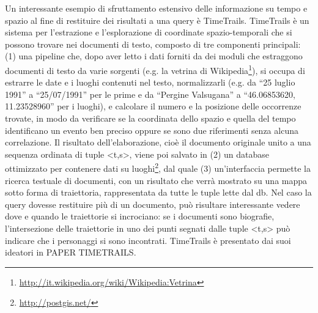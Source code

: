 \documentclass[sigproc-sp.tex]{subfiles}
\begin{document}
Un interessante esempio di sfruttamento estensivo delle informazione su tempo e spazio al fine di restituire dei risultati a una query è TimeTrails. TimeTrails è un sistema per l’estrazione e l’esplorazione di coordinate spazio-temporali che si possono trovare nei documenti di testo, composto di tre componenti principali: (1) una pipeline che, dopo aver letto i dati forniti da dei moduli che estraggono documenti di testo da varie sorgenti (e.g. la vetrina di Wikipedia\footnote{\url{http://it.wikipedia.org/wiki/Wikipedia:Vetrina}}), si occupa di estrarre le date e i luoghi contenuti nel testo, normalizzarli (e.g. da “25 luglio 1991” a “25/07/1991” per le prime e da “Pergine Valsugana” a “46.06853620, 11.23528960” per i luoghi), e calcolare il numero e la posizione delle occorrenze trovate, in modo da verificare se la coordinata dello spazio e quella del tempo identificano un evento ben preciso oppure se sono due riferimenti senza alcuna correlazione. Il risultato dell’elaborazione, cioè il documento originale unito a una sequenza ordinata di tuple <t,s>, viene poi salvato in (2) un database ottimizzato per contenere dati su luoghi\footnote{\url{http://postgis.net/}}, dal quale (3) un’interfaccia permette la ricerca testuale di documenti, con un risultato che verrà mostrato su una mappa sotto forma di traiettoria, rappresentata da tutte le tuple lette dal db. Nel caso la query dovesse restituire più di un documento, può risultare interessante vedere dove e quando le traiettorie si incrociano: se i documenti sono biografie, l’intersezione delle traiettorie in uno dei punti segnati dalle tuple <t,s> può indicare che i personaggi si sono incontrati.
TimeTrails è presentato dai suoi ideatori in PAPER TIMETRAILS.
\end{document}
